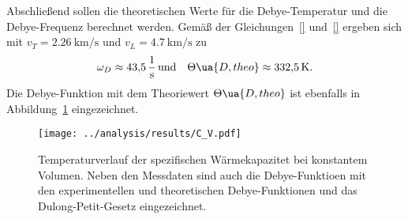 Abschließend sollen die theoretischen Werte für die Debye-Temperatur und die Debye-Frequenz berechnet werden.
Gemäß der Gleichungen~\eqref{} und~\eqref{} ergeben sich mit $v_T = \SI{2.26}{\kilo\meter\per\second}$
und $v_L = \SI{4.7}{\kilo\meter\per\second}$ zu 
\begin{equation}
        \omega_D \approx \SI{43.5}{\per\second} \, \text{und} \quad \Theta\ua{D, theo} \approx \SI{332.5}{\kelvin}.
\end{equation}
Die Debye-Funktion mit dem Theoriewert $\Theta\ua{D, theo}$ ist ebenfalls in Abbildung~\ref{fig: C_V} eingezeichnet.

\begin{figure}
\centering
\texttt{[image: ../analysis/results/C\_V.pdf]}
\caption{Temperaturverlauf der spezifischen Wärmekapazitet bei konstantem Volumen. Neben den Messdaten sind auch die 
Debye-Funktioen mit den experimentellen und theoretischen Debye-Funktionen und das Dulong-Petit-Gesetz eingezeichnet.}
\label{fig: C_V}
\end{figure}

